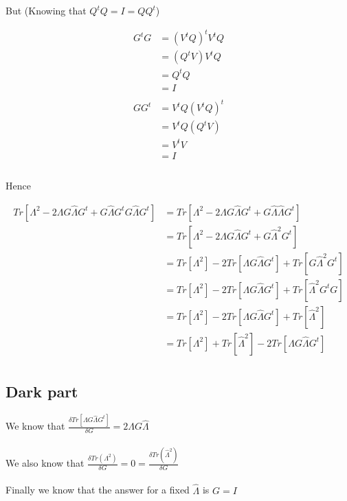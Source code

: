 \documentclass{article}
\begin{document}
    But (Knowing that $Q^tQ = I = QQ^t$)

    \begin{equation*}
        \begin{aligned}
            G^tG &= (V^tQ)^t V^tQ\\
                 &= (Q^tV) V^tQ\\
                 &= Q^tQ\\
                 &= I\\ \\
            GG^t &= V^tQ (V^tQ)^t\\
                 &= V^tQ (Q^tV)\\
                 &= V^tV\\
                 &= I\\ \\
        \end{aligned}
    \end{equation*}

    Hence

    \begin{equation*}
        \begin{aligned}
        Tr[\Lambda^2 - 2 \Lambda G \hat{\Lambda} G^t + G \hat{\Lambda} G^t G \hat{\Lambda} G^t]
        &=
        Tr[\Lambda^2 - 2 \Lambda G \hat{\Lambda} G^t + G \hat{\Lambda} \hat{\Lambda} G^t]\\
        &=
        Tr[\Lambda^2 - 2 \Lambda G \hat{\Lambda} G^t + G \hat{\Lambda}^2 G^t]\\
        &=
        Tr[\Lambda^2] - 2 Tr[\Lambda G \hat{\Lambda} G^t] + Tr[G \hat{\Lambda}^2 G^t]\\
        &=
        Tr[\Lambda^2] - 2 Tr[\Lambda G \hat{\Lambda} G^t] + Tr[ \hat{\Lambda}^2 G^tG]\\
        &=
        Tr[\Lambda^2] - 2 Tr[\Lambda G \hat{\Lambda} G^t] + Tr[ \hat{\Lambda}^2]\\
        &=
        Tr[\Lambda^2] + Tr[ \hat{\Lambda}^2] - 2 Tr[\Lambda G \hat{\Lambda} G^t]\\
        \end{aligned}
    \end{equation*}

    \subsection{Dark part}

    We know that $\frac{\delta Tr[\Lambda G \hat{\Lambda} G^t]}{\delta G} = 2\Lambda G \hat{\Lambda}$\\\\
    We also know that $\frac{\delta Tr(\Lambda^2)}{\delta G} = 0 = \frac{\delta Tr(\hat{\Lambda}^2)}{\delta G}$\\\\
    Finally we know that the answer for a fixed $\hat{\Lambda}$ is $G=I$\\ \\
\end{document}
